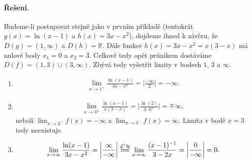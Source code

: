 \documentclass[a4paper,11pt]{article}
\begin{document}
	\paragraph*{Řešení.} Budeme-li postupovat stejně jako v prvním příkladě (tentokrát $g(x) = \ln(x-1)$ a $h(x) = 3x-x^2$), dojdeme ihned k závěru, že $D(g) = (1,\infty)$ a $D(h) = \mathbb R$. Dále funkce $h(x) = 3x - x^2 = x(3-x)$ má nulové body $x_1 = 0$ a $x_2 = 3$. Celkově tedy opět průnikem dostáváme $D(f) = (1,3) \cup (3,\infty)$. Zbývá tedy vyšetřit limity v bodech $1, \, 3$ a $\infty$.
	\begin{enumerate}[label=(\alph*)]
		\item \begin{align*}
			\lim_{x \to 1^+} \frac{\ln(x-1)}{3x-x^2} = \bigg| \frac{-\infty}{2} \bigg| = -\infty.
		\end{align*}
	
		\item \begin{align*}
			\lim_{x \to 3^{\pm}} \frac{\ln(x-1)}{x(3-x)} = \bigg| \frac{\ln(2)}{3\cdot 0^{\mp}} \bigg| = \mp \infty,
		\end{align*}
		neboli $\lim_{x \to 3^+} f(x) = -\infty$ a $\lim_{x \to 3^-} f(x) = \infty$. Limita v bodě $x = 3$ tedy neexistuje.
	
		\item \begin{align*}
			\lim_{x \to \infty} \frac{\ln(x-1)}{3x-x^2} = \bigg| \frac{\infty}{-\infty} \bigg| \overset{\mathcal{L'H}}{=\joinrel=} \lim_{x \to \infty} \frac{(x-1)^{-1}}{3-2x} = \bigg| \frac{0}{-\infty} \bigg| = 0.
		\end{align*}
	\end{enumerate}
	
	
\end{document}
